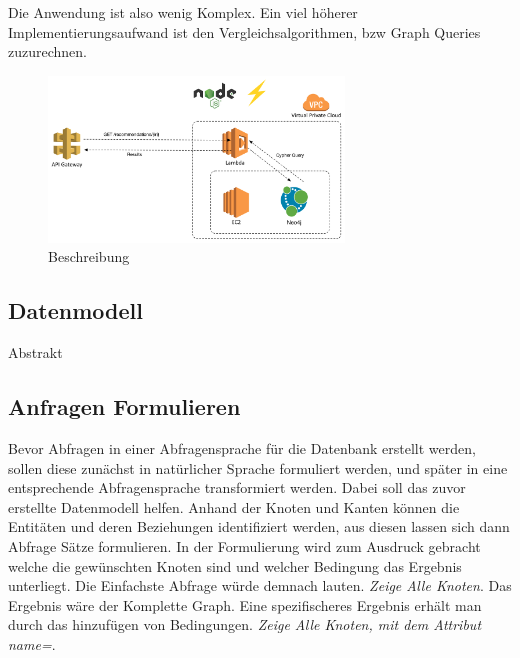 Die Anwendung ist also wenig Komplex. Ein viel höherer Implementierungsaufwand ist den Vergleichsalgorithmen, bzw Graph Queries zuzurechnen. 

\begin{figure}[htb]
 \centering
 \includegraphics[width=0.7\textwidth,angle=0]{abb/Architecture}
 \caption[Beschreibung]{Beschreibung}
\label{fig:Beschreibung}
\end{figure}

\subsection{Datenmodell}

Abstrakt 
\subsection{Anfragen Formulieren}

Bevor Abfragen in einer Abfragensprache für die Datenbank erstellt werden, sollen diese zunächst in natürlicher Sprache formuliert werden, und später in eine entsprechende Abfragensprache  transformiert werden. Dabei soll das zuvor erstellte  Datenmodell helfen. Anhand der Knoten und Kanten können die Entitäten und deren Beziehungen identifiziert werden, aus diesen lassen sich dann Abfrage Sätze formulieren. In der Formulierung wird zum Ausdruck gebracht welche die gewünschten Knoten sind und welcher Bedingung das Ergebnis unterliegt. Die Einfachste Abfrage würde demnach lauten. \textit{Zeige Alle Knoten}. Das Ergebnis wäre der Komplette Graph. Eine spezifischeres Ergebnis erhält man durch das hinzufügen von Bedingungen. \textit{  Zeige Alle Knoten, mit dem Attribut {name=\textbf{\texttt{}}}}. 

